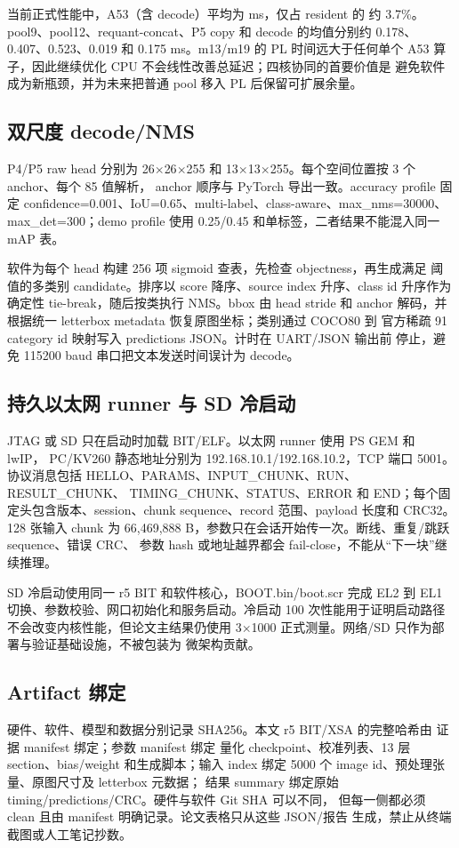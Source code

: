 当前正式性能中，A53（含 decode）平均为 \AFTMeanMs{} ms，仅占 resident 的
约 3.7\%。pool9、pool12、requant-concat、P5 copy 和 decode 的均值分别约
0.178、0.407、0.523、0.019 和 0.175 ms。m13/m19 的 PL 时间远大于任何单个
A53 算子，因此继续优化 CPU 不会线性改善总延迟；四核协同的首要价值是
避免软件成为新瓶颈，并为未来把普通 pool 移入 PL 后保留可扩展余量。

\subsection{双尺度 decode/NMS}

P4/P5 raw head 分别为 26$\times$26$\times$255 和
13$\times$13$\times$255。每个空间位置按 3 个 anchor、每个 85 值解析，
anchor 顺序与 PyTorch 导出一致。accuracy profile 固定
confidence=0.001、IoU=0.65、multi-label、class-aware、max\_nms=30000、
max\_det=300；demo profile 使用 0.25/0.45 和单标签，二者结果不能混入同一
mAP 表。

软件为每个 head 构建 256 项 sigmoid 查表，先检查 objectness，再生成满足
阈值的多类别 candidate。排序以 score 降序、source index 升序、class id
升序作为确定性 tie-break，随后按类执行 NMS。bbox 由 head stride 和 anchor
解码，并根据统一 letterbox metadata 恢复原图坐标；类别通过 COCO80 到
官方稀疏 91 category id 映射写入 predictions JSON。计时在 UART/JSON 输出前
停止，避免 115200 baud 串口把文本发送时间误计为 decode。

\subsection{持久以太网 runner 与 SD 冷启动}

JTAG 或 SD 只在启动时加载 BIT/ELF。以太网 runner 使用 PS GEM 和 lwIP，
PC/KV260 静态地址分别为 192.168.10.1/192.168.10.2，TCP 端口 5001。
协议消息包括 HELLO、PARAMS、INPUT\_CHUNK、RUN、RESULT\_CHUNK、
TIMING\_CHUNK、STATUS、ERROR 和 END；每个固定头包含版本、session、chunk
sequence、record 范围、payload 长度和 CRC32。128 张输入 chunk 为
66,469,888 B，参数只在会话开始传一次。断线、重复/跳跃 sequence、错误 CRC、
参数 hash 或地址越界都会 fail-close，不能从“下一块”继续推理。

SD 冷启动使用同一 r5 BIT 和软件核心，BOOT.bin/boot.scr 完成 EL2 到 EL1
切换、参数校验、网口初始化和服务启动。冷启动 100 次性能用于证明启动路径
不会改变内核性能，但论文主结果仍使用 3$\times$1000 正式测量。网络/SD
只作为部署与验证基础设施，不被包装为 \LASA 微架构贡献。

\subsection{Artifact 绑定}

硬件、软件、模型和数据分别记录 SHA256。本文 r5 BIT/XSA 的完整哈希由
证据 manifest 绑定；参数 manifest 绑定
量化 checkpoint、校准列表、13 层 section、bias/weight 和生成脚本；输入
index 绑定 5000 个 image id、预处理张量、原图尺寸及 letterbox 元数据；
结果 summary 绑定原始 timing/predictions/CRC。硬件与软件 Git SHA 可以不同，
但每一侧都必须 clean 且由 manifest 明确记录。论文表格只从这些 JSON/报告
生成，禁止从终端截图或人工笔记抄数。

